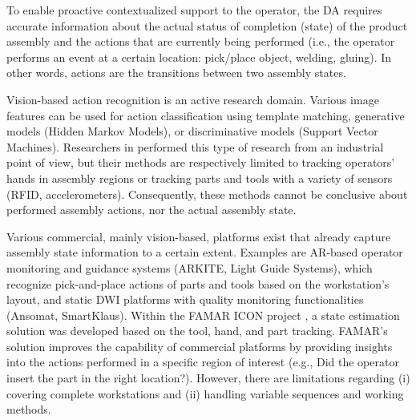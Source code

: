 To enable proactive contextualized support to the operator, the DA requires accurate information about the actual status of completion (state) of the product assembly and the actions that are currently being performed (i.e., the operator performs an event at a certain location: pick/place object, welding, gluing). In other words, actions are the transitions between two assembly states.
 
Vision-based action recognition \cite{beddiar2020VisionbasedHumanActivity, zhang2017ReviewHumanActivity} is an active research domain. Various image features can be used for action classification using template matching, generative models (Hidden Markov Models), or discriminative models (Support Vector Machines). Researchers in \cite{kaczmarek2015ProgressMonitoringGesture,karcher2018SensordrivenAnalysisManual} performed this type of research from an industrial point of view, but their methods are respectively limited to tracking operators' hands in assembly regions or tracking parts and tools with a variety of sensors (RFID, accelerometers). Consequently, these methods cannot be conclusive about performed assembly actions, nor the actual assembly state.

Various commercial, mainly vision-based, platforms exist that already capture assembly state information to a certain extent. Examples are AR-based operator monitoring and guidance systems (ARKITE, Light Guide Systems), which recognize pick-and-place actions of parts and tools based on the workstation's layout, and static DWI platforms with quality monitoring functionalities (Ansomat, SmartKlaus). Within the FAMAR ICON project \cite{zogopoulos2021ImagebasedStateTracking}, a state estimation solution was developed based on the tool, hand, and part tracking. FAMAR's solution improves the capability of commercial platforms by providing insights into the actions performed in a specific region of interest (e.g., Did the operator insert the part in the right location?). However, there are limitations regarding (i) covering complete workstations and (ii) handling variable sequences and working methods. 
